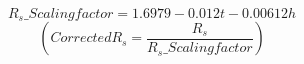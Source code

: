 \begin{table}[H]
\begin{tabular}{p{0.23in}p{1.24in}p{1.55in}p{2.74in}}
\end{tabular}
 \end{table}




\vspace{\baselineskip}
\par


\begin{equation}\tag{5.8}
R_{s} \_ Scaling factor=1.6979-0.012t-0.00612h
\end{equation}
\begin{equation*}
   (  Corrected R_{s}= \frac{R_{s}}{R_{s} \_ Scaling factor})
\end{equation*}






